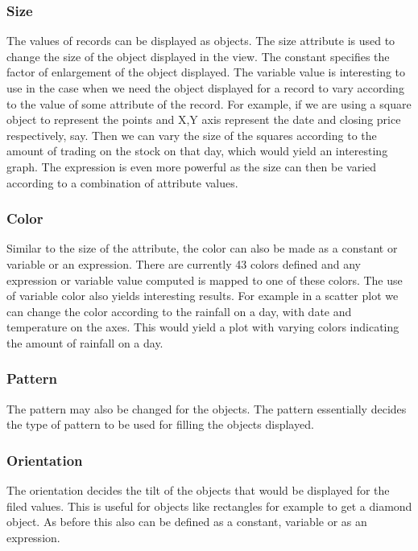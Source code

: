 
\subsubsection{Size}

The values of records can be displayed as objects. The size attribute
is used to change the size of the object displayed in the view. The
constant specifies the factor of enlargement of the object
displayed. The variable value is interesting to use in the case when
we need the object displayed for a record to vary according to the
value of some attribute of the record. For example, if we are using a
square object to represent the points and X,Y axis represent the date
and closing price respectively, say. Then we can vary the size of the
squares according to the amount of trading on the stock on that day,
which would yield an interesting graph. The expression is even more
powerful as the size can then be varied according to a combination of
attribute values.

\subsubsection{Color}

Similar to the size of the attribute, the color can also be made as a constant or variable or an expression. There are currently 43 colors defined and any expression or variable value computed is mapped to one of these colors. The use of variable color also yields interesting results. For example in a scatter plot we can change the color according to the rainfall on a day, with date and temperature on the axes. This would yield a plot with varying colors indicating the amount of rainfall on a day.

\subsubsection{Pattern}

The pattern may also be changed for the objects. The pattern
essentially decides the type of pattern to be used for filling the
objects displayed.

\subsubsection{Orientation}

The orientation decides the tilt of the objects that would be
displayed for the filed values. This is useful for objects like
rectangles for example to get a diamond object. As before this also
can be defined as a constant, variable or as an expression.

